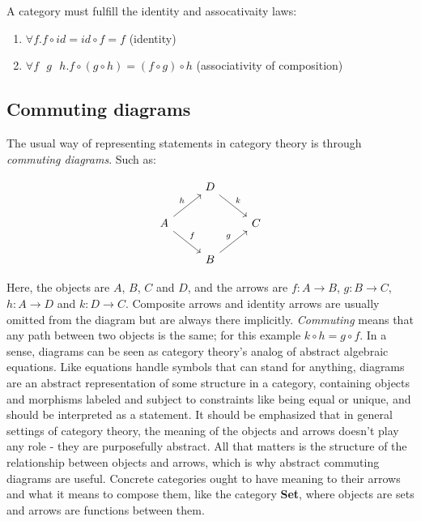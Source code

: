 A category must fulfill the identity and assocativaity laws:

\begin{enumerate}
  \item $ \forall f. f \circ id = id \circ f = f $ (identity)
  \item $ \forall f\text{ }g\text{ }h. f \circ (g \circ h) = (f \circ g) \circ h $ (associativity of composition)
\end{enumerate}

\subsection{Commuting diagrams}
The usual way of representing statements in category theory is through \textit{commuting diagrams}. Such as:

\[\begin{tikzcd}
	& D \\
	A && C \\
	& B
	\arrow["f", from=2-1, to=3-2]
	\arrow["g", from=3-2, to=2-3]
	\arrow["h", from=2-1, to=1-2]
	\arrow["k", from=1-2, to=2-3]
\end{tikzcd}\]

Here, the objects are $ A $, $ B $, $ C $ and $ D $, and the arrows are $ f : A \rightarrow B $, $ g : B \rightarrow C $, $ h : A \rightarrow D $ and $ k : D \rightarrow C $. Composite arrows and identity arrows are usually omitted from the diagram but are always there implicitly. \textit{Commuting} means that any path between two objects is the same; for this example $ k \circ h = g \circ f $. In a sense, diagrams can be seen as category theory's analog of abstract algebraic equations. Like equations handle symbols that can stand for anything, diagrams are an abstract representation of some structure in a category, containing objects and morphisms labeled and subject to constraints like being equal or unique, and should be interpreted as a statement. It should be emphasized that in general settings of category theory, the meaning of the objects and arrows doesn't play any role - they are purposefully abstract. All that matters is the structure of the relationship between objects and arrows, which is why abstract commuting diagrams are useful. Concrete categories ought to have meaning to their arrows and what it means to compose them, like the category \textbf{Set}, where objects are sets and arrows are functions between them. 

